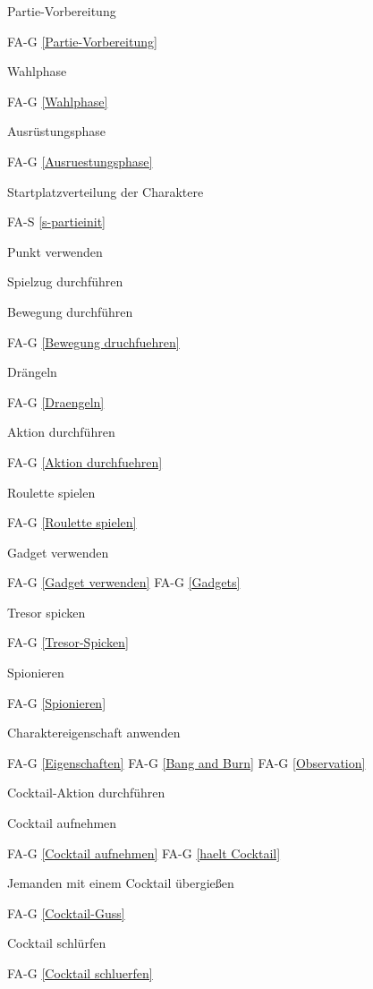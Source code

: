Partie-Vorbereitung

FA-G \ref{Partie-Vorbereitung} %

Wahlphase

FA-G \ref{Wahlphase} %

Ausrüstungsphase

FA-G \ref{Ausruestungsphase} %

Startplatzverteilung der Charaktere

FA-S \ref{s-partieinit} %

Punkt verwenden

Spielzug durchführen

Bewegung durchführen

FA-G \ref{Bewegung druchfuehren} %

Drängeln

FA-G \ref{Draengeln} %

Aktion durchführen

FA-G \ref{Aktion durchfuehren} %

Roulette spielen

FA-G \ref{Roulette spielen} %

Gadget verwenden

FA-G \ref{Gadget verwenden} %
FA-G \ref{Gadgets} %

Tresor spicken

FA-G \ref{Tresor-Spicken} %

Spionieren

FA-G \ref{Spionieren} %

Charaktereigenschaft anwenden

FA-G \ref{Eigenschaften} %
FA-G \ref{Bang and Burn} %
FA-G \ref{Observation} %

Cocktail-Aktion durchführen

Cocktail aufnehmen

FA-G \ref{Cocktail aufnehmen} %
FA-G \ref{haelt Cocktail} %

Jemanden mit einem Cocktail übergießen

FA-G \ref{Cocktail-Guss} %

Cocktail schlürfen

FA-G \ref{Cocktail schluerfen} %



